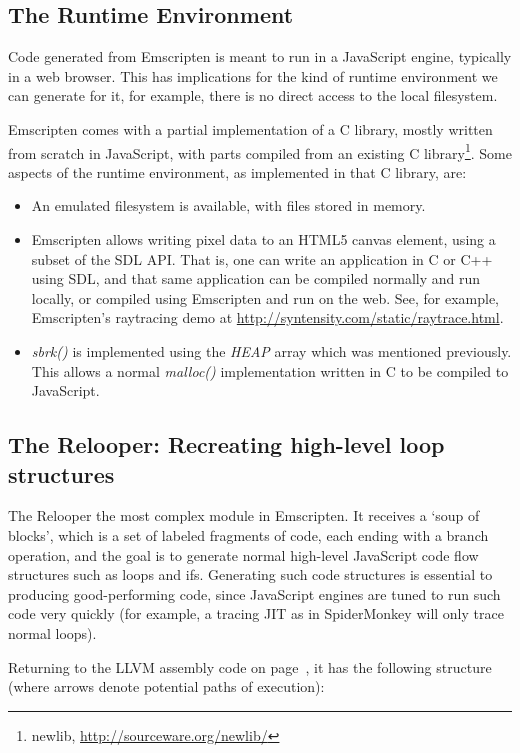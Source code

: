 \documentclass[preprint,10pt]{sigplanconf}
\begin{document}
\subsection{The Runtime Environment}
\label{sec:runtime}

Code generated from Emscripten is meant to run in a JavaScript engine,
typically in a web browser. This has implications for the kind of
runtime environment we can generate for it, for example, there is no
direct access to the local filesystem.

Emscripten comes with a partial implementation of a C library,
mostly written from scratch in JavaScript, with parts compiled from an
existing C library\footnote{newlib, \url{http://sourceware.org/newlib/}}. Some aspects of the runtime environment, as
implemented in that C library, are:
\begin{itemize}
\item An emulated filesystem is available, with files stored in memory.
\item Emscripten allows writing pixel data to an HTML5 canvas element,
      using a subset of the SDL API. That is, one can write an application in C or C++ using
      SDL, and that same application can be compiled normally and run
      locally, or compiled using Emscripten and run on the web. See, for
      example, Emscripten's raytracing demo at \url{http://syntensity.com/static/raytrace.html}.
\item \emph{sbrk()} is implemented using the \emph{HEAP} array which
      was mentioned previously. This allows a normal \emph{malloc()}
      implementation written in C to be compiled to JavaScript.
\end{itemize}

\subsection{The Relooper: Recreating high-level loop structures}
\label{sec:relooper}

The Relooper the most complex module in Emscripten. It receives
a `soup of blocks', which is a set of labeled fragments of code, each
ending with a branch operation, and the goal is to generate normal
high-level JavaScript code flow structures such as loops and ifs.
Generating such code structures is essential to producing good-performing code,
since JavaScript engines are tuned to run such code very quickly (for
example, a tracing JIT as in SpiderMonkey will only trace normal loops).

Returning to the LLVM assembly code on page~\pageref{code:examplellvm}, it
has the following structure (where arrows denote potential paths of execution):
\end{document}
